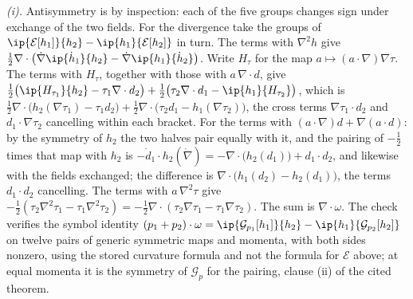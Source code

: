 \emph{(i).} Antisymmetry is by inspection: each of the five groups changes sign under exchange of the two fields. For the divergence take the groups of $\ip{\mathcal{E}[h_{1}]}{h_{2}} - \ip{h_{1}}{\mathcal{E}[h_{2}]}$ in turn. The terms with $\nabla^{2}h$ give $\tfrac12\nabla \cdot \bigl(\dot\nabla\ip{\dot h_{1}}{h_{2}} - \dot\nabla\ip{h_{1}}{\dot h_{2}}\bigr)$. Write $H_{\tau}$ for the map $a \mapsto (a \cdot \nabla)\nabla\tau$. The terms with $H_{\tau}$, together with those with $a\,\nabla \cdot d$, give $\tfrac12\bigl(\ip{H_{\tau_{1}}}{h_{2}} - \tau_{1}\nabla \cdot d_{2}\bigr) + \tfrac12\bigl(\tau_{2}\nabla \cdot d_{1} - \ip{h_{1}}{H_{\tau_{2}}}\bigr)$, which is $\tfrac12\nabla \cdot \bigl(h_{2}(\nabla\tau_{1}) - \tau_{1}d_{2}\bigr) + \tfrac12\nabla \cdot \bigl(\tau_{2}d_{1} - h_{1}(\nabla\tau_{2})\bigr)$, the cross terms $\nabla\tau_{1} \cdot d_{2}$ and $d_{1} \cdot \nabla\tau_{2}$ cancelling within each bracket. For the terms with $(a \cdot \nabla)d + \nabla(a \cdot d)$: by the symmetry of $h_{2}$ the two halves pair equally with it, and the pairing of $-\tfrac12$ times that map with $h_{2}$ is $-\dot d_{1} \cdot h_{2}(\dot\nabla) = -\nabla \cdot \bigl(h_{2}(d_{1})\bigr) + d_{1} \cdot d_{2}$, and likewise with the fields exchanged; the difference is $\nabla \cdot \bigl(h_{1}(d_{2}) - h_{2}(d_{1})\bigr)$, the terms $d_{1} \cdot d_{2}$ cancelling. The terms with $a\,\nabla^{2}\tau$ give $-\tfrac12(\tau_{2}\nabla^{2}\tau_{1} - \tau_{1}\nabla^{2}\tau_{2}) = -\tfrac12\nabla \cdot (\tau_{2}\nabla\tau_{1} - \tau_{1}\nabla\tau_{2})$. The sum is $\nabla \cdot \omega$. The check verifies the symbol identity $(p_{1} + p_{2}) \cdot \omega = \ip{\mathcal{G}_{p_{1}}[h_{1}]}{h_{2}} - \ip{h_{1}}{\mathcal{G}_{p_{2}}[h_{2}]}$ on twelve pairs of generic symmetric maps and momenta, with both sides nonzero, using the stored curvature formula and not the formula for $\mathcal{E}$ above; at equal momenta it is the symmetry of $\mathcal{G}_{p}$ for the pairing, clause (ii) of the cited theorem.


